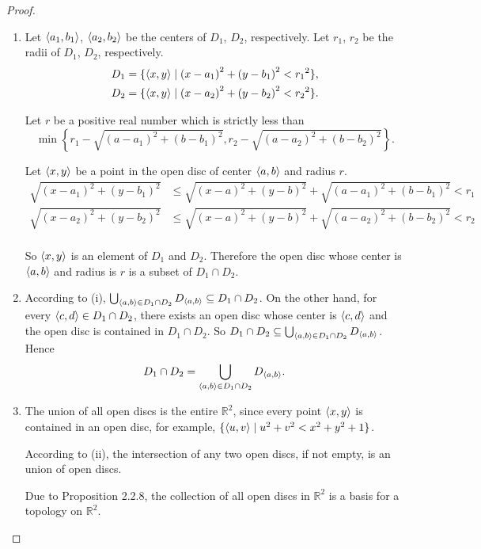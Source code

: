 \begin{proof}
    \begin{enumerate}[label={(\roman*)}]
        \item Let $\left\langle{a_{1}, b_{1}}\right\rangle$, $\left\langle{a_{2}, b_{2}}\right\rangle$ be the centers of $D_{1}$, $D_{2}$, respectively. Let $r_{1}$, $r_{2}$ be the radii of $D_{1}$, $D_{2}$, respectively.
              \[
                  \begin{split}
                      D_{1} = \{ \left\langle{x, y}\right\rangle\mid {(x - a_{1})}^{2} + {(y - b_{1})}^{2} < {r_{1}}^{2} \}, \\
                      D_{2} = \{ \left\langle{x, y}\right\rangle\mid {(x - a_{2})}^{2} + {(y - b_{2})}^{2} < {r_{2}}^{2} \}.
                  \end{split}
              \]

              Let $r$ be a positive real number which is strictly less than
              \[
                  \min\left\{ r_{1} - \sqrt{{(a-a_{1})}^{2} + {(b-b_{1})}^{2}}, r_{2} - \sqrt{{(a-a_{2})}^{2} + {(b-b_{2})}^{2}} \right\}.
              \]

              Let $\left\langle{x, y}\right\rangle$ be a point in the open disc of center $\left\langle{a, b}\right\rangle$ and radius $r$.
              \begin{align*}
                  \sqrt{{(x-a_{1})}^{2} + {(y-b_{1})}^{2}} & \leq \sqrt{{(x-a)}^{2} + {(y-b)}^{2}} + \sqrt{{(a-a_{1})}^{2} + {(b-b_{1})}^{2}} < r_{1} \\
                  \sqrt{{(x-a_{2})}^{2} + {(y-b_{2})}^{2}} & \leq \sqrt{{(x-a)}^{2} + {(y-b)}^{2}} + \sqrt{{(a-a_{2})}^{2} + {(b-b_{2})}^{2}} < r_{2} \\
              \end{align*}

              So $\left\langle{x, y}\right\rangle$ is an element of $D_{1}$ and $D_{2}$. Therefore the open disc whose center is $\left\langle{a, b}\right\rangle$ and radius is $r$ is a subset of $D_{1}\cap D_{2}$.
        \item According to (i), $\bigcup_{\left\langle{a, b}\right\rangle\in D_{1}\cap D_{2}} D_{\left\langle{a, b}\right\rangle}\subseteq D_{1}\cap D_{2}$. On the other hand, for every $\left\langle{c, d}\right\rangle\in D_{1}\cap D_{2}$, there exists an open disc whose center is $\left\langle{c, d}\right\rangle$ and the open disc is contained in $D_{1}\cap D_{2}$. So $D_{1}\cap D_{2}\subseteq \bigcup_{\left\langle{a, b}\right\rangle\in D_{1}\cap D_{2}} D_{\left\langle{a, b}\right\rangle}$. Hence
              \[
                  D_{1}\cap D_{2} = \bigcup_{\left\langle{a, b}\right\rangle\in D_{1}\cap D_{2}} D_{\left\langle{a, b}\right\rangle}.
              \]
        \item The union of all open discs is the entire $\mathbb{R}^{2}$, since every point $\left\langle{x, y}\right\rangle$ is contained in an open disc, for example, $\{ \left\langle{u, v}\right\rangle \mid u^{2} + v^{2} < x^{2} + y^{2} + 1 \}$.

              According to (ii), the intersection of any two open discs, if not empty, is an union of open discs.

              Due to Proposition 2.2.8, the collection of all open discs in $\mathbb{R}^{2}$ is a basis for a topology on $\mathbb{R}^{2}$.
    \end{enumerate}
\end{proof}
\newpage

